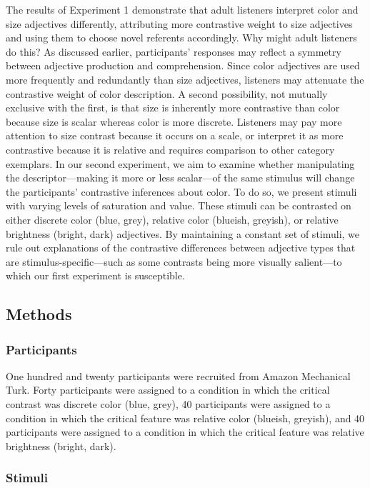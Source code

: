 \documentclass[10pt, letterpaper]{article}
\begin{document}
The results of Experiment 1 demonstrate that adult listeners interpret
color and size adjectives differently, attributing more contrastive
weight to size adjectives and using them to choose novel referents
accordingly. Why might adult listeners do this? As discussed earlier,
participants' responses may reflect a symmetry between adjective
production and comprehension. Since color adjectives are used more
frequently and redundantly than size adjectives, listeners may attenuate
the contrastive weight of color description. A second possibility, not
mutually exclusive with the first, is that size is inherently more
contrastive than color because size is scalar whereas color is more
discrete. Listeners may pay more attention to size contrast because it
occurs on a scale, or interpret it as more contrastive because it is
relative and requires comparison to other category exemplars. In our
second experiment, we aim to examine whether manipulating the
descriptor---making it more or less scalar---of the same stimulus will
change the participants' contrastive inferences about color. To do so,
we present stimuli with varying levels of saturation and value. These
stimuli can be contrasted on either discrete color (blue, grey),
relative color (blueish, greyish), or relative brightness (bright, dark)
adjectives. By maintaining a constant set of stimuli, we rule out
explanations of the contrastive differences between adjective types that
are stimulus-specific---such as some contrasts being more visually
salient---to which our first experiment is susceptible.

\subsection{Methods}\label{methods}

\subsubsection{Participants}\label{participants}

One hundred and twenty participants were recruited from Amazon
Mechanical Turk. Forty participants were assigned to a condition in
which the critical contrast was discrete color (blue, grey), 40
participants were assigned to a condition in which the critical feature
was relative color (blueish, greyish), and 40 participants were assigned
to a condition in which the critical feature was relative brightness
(bright, dark).

\subsubsection{Stimuli}\label{stimuli}
\end{document}
